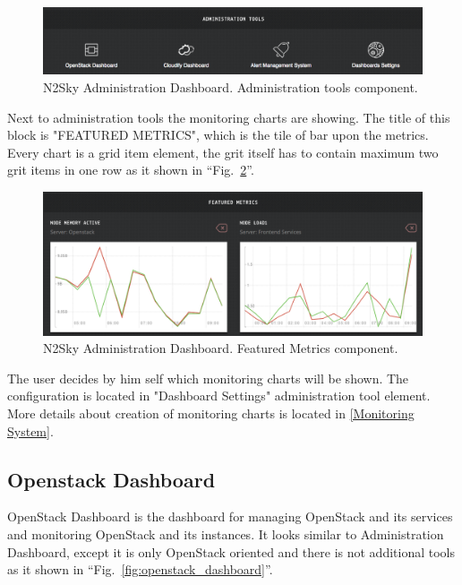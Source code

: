 \begin{figure}[htbp]
\begin{center}
  \includegraphics[width=\linewidth]{components/4/pics/admin_tools.png}
  \caption{N2Sky Administration Dashboard. Administration tools component.}
  \label{fig:admin_tools}
\end{center}
\end{figure}

Next to administration tools the monitoring charts are showing. The title of this block is "FEATURED METRICS", which is the tile of bar upon the metrics.
Every chart is a grid item element, the grit itself has to contain maximum two grit items in one row as it shown in ``Fig.~\ref{fig:featured_metrics}''. 
 
\begin{figure}[htbp]
\begin{center}
  \includegraphics[width=\linewidth]{components/4/pics/featured_metrics.png}
  \caption{N2Sky Administration Dashboard. Featured Metrics component.}
  \label{fig:featured_metrics}
\end{center}
\end{figure}
 
 
The user decides by him self which monitoring charts will be shown. The configuration is located in "Dashboard Settings" administration tool element. More details about creation of monitoring charts is located in \autoref{Monitoring System}. 


\subsection{Openstack Dashboard}\label{OpenStack Dashboard}

OpenStack Dashboard is the dashboard for managing OpenStack and its services and monitoring OpenStack and its instances. It looks similar to Administration Dashboard, except it is only OpenStack oriented and there is not additional tools as it shown in ``Fig.~\ref{fig:openstack_dashboard}''. 

